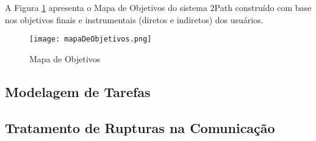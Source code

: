 \indent A Figura \ref{fig:mapaDeObjetivos} apresenta o Mapa de Objetivos do sistema 2Path construído com base nos objetivos finais e instrumentais (diretos e indiretos) dos usuários. 

\begin{figure}[!h]
    \centering
    \texttt{[image: mapaDeObjetivos.png]}
    \caption{Mapa de Objetivos}
    \label{fig:mapaDeObjetivos}
\end{figure} 

\subsection{Modelagem de Tarefas}

\subsection{Tratamento de Rupturas na Comunicação}

